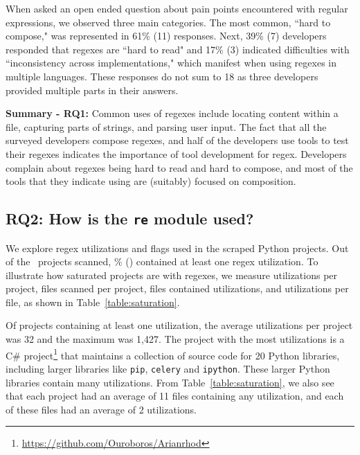 When asked an open ended question about pain points encountered with regular expressions, we observed three main categories. The most common, ``hard to compose," was represented in 61\% (11) responses. Next,
 39\% (7) developers responded that regexes are ``hard to read" and 17\% (3) indicated difficulties with ``inconsistency across implementations," which manifest when using regexes in multiple languages. These responses do not sum to 18 as three developers provided multiple parts in their answers.

\vspace{6pt}
\textbf{Summary - RQ1:}
Common uses of regexes include locating content within a file, capturing parts of strings, and parsing user input.
The fact that all the surveyed developers compose regexes, and half of the developers use tools to test their regexes indicates the importance of tool development for regex.  Developers complain about regexes being hard to read and hard to compose, and most of the tools that they indicate using are (suitably) focused on composition.



\subsection{RQ2: How  is the {\tt re} module used?}
We explore regex utilizations and flags used in the scraped Python projects.
Out of the \ projects scanned, \% () contained at least one regex utilization.  To illustrate how saturated projects are with regexes, we measure utilizations per project, files scanned per project, files contained utilizations, and  utilizations  per file, as shown in Table~\ref{table:saturation}.

Of projects containing at least one utilization, the average utilizations per project was 32 and the maximum  was 1,427.  The project with the most utilizations is a C\# project\footnote{\url{https://github.com/Ouroboros/Arianrhod}} that maintains a collection of source code for 20 Python libraries, including larger libraries like {\tt pip}, {\tt celery} and {\tt ipython}.  These larger Python libraries contain many utilizations.
From Table~\ref{table:saturation}, we also see that each project had an average of 11 files containing any utilization, and each of these files had an average of 2 utilizations.



